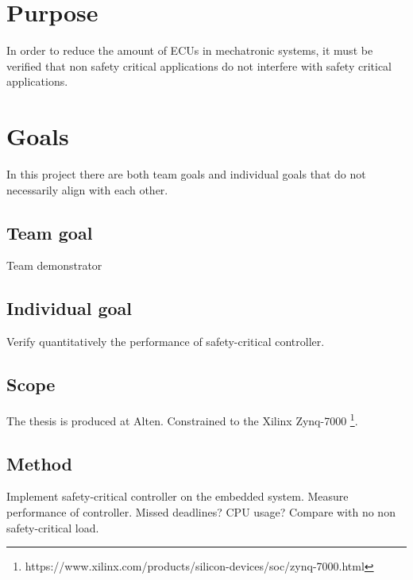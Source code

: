 \section{Purpose}
In order to reduce the amount of ECUs in mechatronic systems, it must be verified that non safety critical applications do not interfere with safety critical applications.

\section{Goals}
In this project there are both team goals and individual goals that do not necessarily align with each other.

\subsection{Team goal}
Team demonstrator

\subsection{Individual goal}
Verify quantitatively the performance of safety-critical controller.

\subsection{Scope}
The thesis is produced at Alten.
Constrained to the Xilinx Zynq-7000 \footnote{https://www.xilinx.com/products/silicon-devices/soc/zynq-7000.html}.

\subsection{Method}
Implement safety-critical controller on the embedded system. Measure performance of controller. Missed deadlines? CPU usage? Compare with no non safety-critical load.